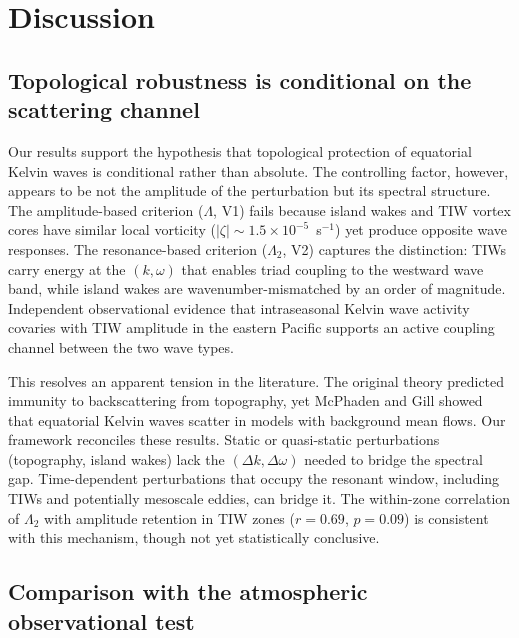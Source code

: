 \documentclass[11pt]{article}
\begin{document}
\section{Discussion}
\label{sec:discussion}

\subsection{Topological robustness is conditional on the scattering channel}

Our results support the hypothesis that topological protection of equatorial Kelvin waves\cite{Delplace2017} is conditional rather than absolute. The controlling factor, however, appears to be not the amplitude of the perturbation but its spectral structure. The amplitude-based criterion ($\Lambda$, V1) fails because island wakes and TIW vortex cores have similar local vorticity ($|\zeta| \sim 1.5 \times 10^{-5}$~s$^{-1}$) yet produce opposite wave responses. The resonance-based criterion ($\Lambda_2$, V2) captures the distinction: TIWs carry energy at the $(k, \omega)$ that enables triad coupling to the westward wave band\cite{Lyman2005}, while island wakes are wavenumber-mismatched by an order of magnitude. Independent observational evidence that intraseasonal Kelvin wave activity covaries with TIW amplitude in the eastern Pacific\cite{EscobarFranco2022} supports an active coupling channel between the two wave types.

This resolves an apparent tension in the literature. The original theory predicted immunity to backscattering from topography\cite{Delplace2017}, yet McPhaden and Gill showed that equatorial Kelvin waves scatter in models with background mean flows\cite{McPhaden1987}. Our framework reconciles these results. Static or quasi-static perturbations (topography, island wakes) lack the $(\Delta k, \Delta\omega)$ needed to bridge the spectral gap. Time-dependent perturbations that occupy the resonant window, including TIWs and potentially mesoscale eddies, can bridge it. The within-zone correlation of $\Lambda_2$ with amplitude retention in TIW zones ($r = 0.69$, $p = 0.09$) is consistent with this mechanism, though not yet statistically conclusive.

\subsection{Comparison with the atmospheric observational test}
\end{document}
